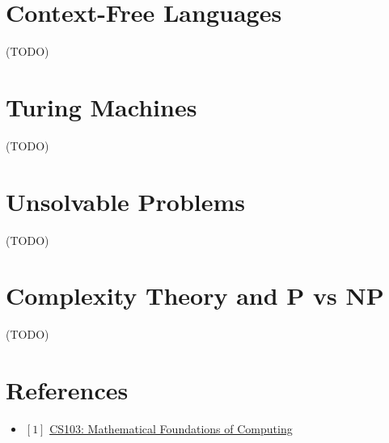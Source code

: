 \documentclass[12pt, letterpaper, oneside]{book}
\begin{document}
\chapter{Context-Free Languages}

 (TODO)

%
%

\chapter{Turing Machines}

 (TODO)

%
%

\chapter{Unsolvable Problems}

 (TODO)

%
%

\chapter{Complexity Theory and P vs NP}

 (TODO)

\chapter*{References}

\begin{itemize}
  \item $[1]$ \href{https://web.stanford.edu/class/cs103/}{CS103: Mathematical Foundations of Computing}
\end{itemize}
\end{document}
